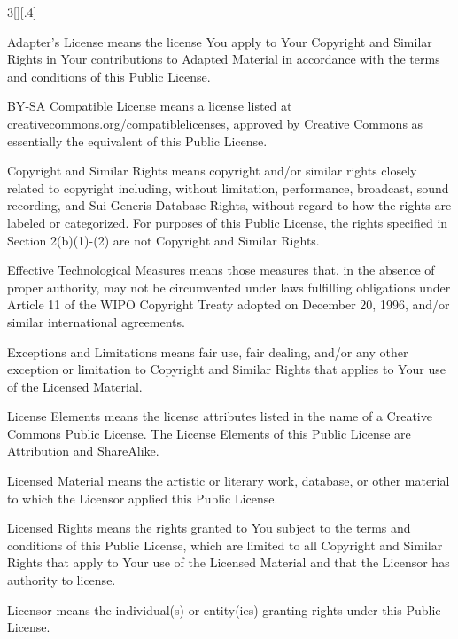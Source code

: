 \documentclass[8pt,a4paper]{article}
\begin{document}
\begin{multicols}{3}[][.4\paperwidth]
\begin{longenum}
\begin{longenum}
  \item Adapter's License means the license You apply to Your Copyright
     and Similar Rights in Your contributions to Adapted Material in
     accordance with the terms and conditions of this Public License.

  \item BY-SA Compatible License means a license listed at
     creativecommons.org/compatiblelicenses, approved by Creative
     Commons as essentially the equivalent of this Public License.

  \item Copyright and Similar Rights means copyright and/or similar rights
     closely related to copyright including, without limitation,
     performance, broadcast, sound recording, and Sui Generis Database
     Rights, without regard to how the rights are labeled or
     categorized. For purposes of this Public License, the rights
     specified in Section 2(b)(1)-(2) are not Copyright and Similar
     Rights.

  \item Effective Technological Measures means those measures that, in the
     absence of proper authority, may not be circumvented under laws
     fulfilling obligations under Article 11 of the WIPO Copyright
     Treaty adopted on December 20, 1996, and/or similar international
     agreements.

  \item Exceptions and Limitations means fair use, fair dealing, and/or
     any other exception or limitation to Copyright and Similar Rights
     that applies to Your use of the Licensed Material.

  \item License Elements means the license attributes listed in the name
     of a Creative Commons Public License. The License Elements of this
     Public License are Attribution and ShareAlike.

  \item Licensed Material means the artistic or literary work, database,
     or other material to which the Licensor applied this Public
     License.

  \item Licensed Rights means the rights granted to You subject to the
     terms and conditions of this Public License, which are limited to
     all Copyright and Similar Rights that apply to Your use of the
     Licensed Material and that the Licensor has authority to license.

  \item Licensor means the individual(s) or entity(ies) granting rights
     under this Public License.


\end{longenum}
\end{longenum}
\end{multicols}
\end{document}
